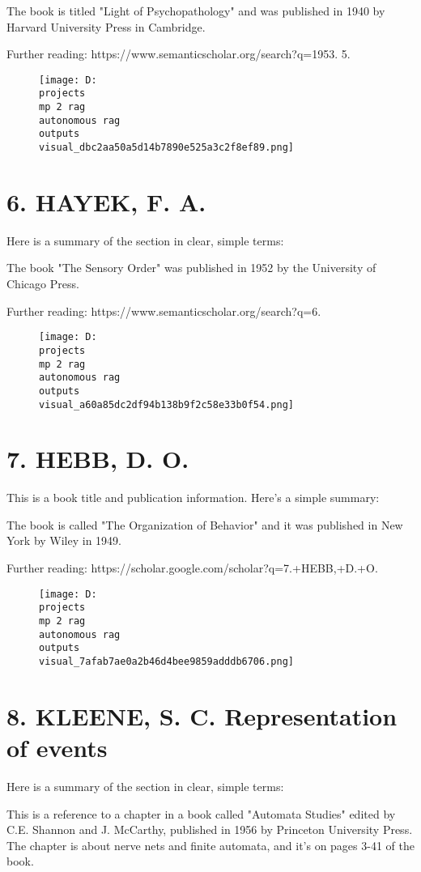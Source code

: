 \documentclass[12pt,a4paper]{article}
\begin{document}
The book is titled "Light of Psychopathology" and was published in 1940 by Harvard University Press in Cambridge.

Further reading: https://www.semanticscholar.org/search?q=1953.
5.%
\begin{figure}[h]
\centering
\texttt{[image: D:\\projects\\mp 2 rag\\autonomous rag\\outputs\\visual\_dbc2aa50a5d14b7890e525a3c2f8ef89.png]}
\end{figure}
\section{6. HAYEK, F. A.}
Here is a summary of the section in clear, simple terms:

The book "The Sensory Order" was published in 1952 by the University of Chicago Press.

Further reading: https://www.semanticscholar.org/search?q=6.%
\begin{figure}[h]
\centering
\texttt{[image: D:\\projects\\mp 2 rag\\autonomous rag\\outputs\\visual\_a60a85dc2df94b138b9f2c58e33b0f54.png]}
\end{figure}
\section{7. HEBB, D. O.}
This is a book title and publication information. Here's a simple summary:

The book is called "The Organization of Behavior" and it was published in New York by Wiley in 1949.

Further reading: https://scholar.google.com/scholar?q=7.+HEBB,+D.+O.
\begin{figure}[h]
\centering
\texttt{[image: D:\\projects\\mp 2 rag\\autonomous rag\\outputs\\visual\_7afab7ae0a2b46d4bee9859adddb6706.png]}
\end{figure}
\section{8. KLEENE, S. C. Representation of events}
Here is a summary of the section in clear, simple terms:

This is a reference to a chapter in a book called "Automata Studies" edited by C.E. Shannon and J. McCarthy, published in 1956 by Princeton University Press. The chapter is about nerve nets and finite automata, and it's on pages 3-41 of the book.
\end{document}
